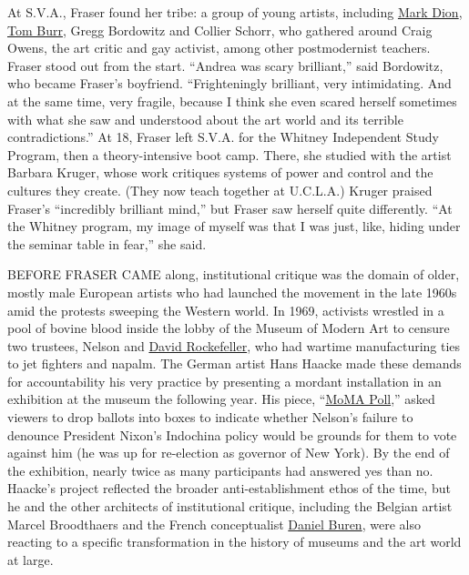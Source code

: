At S.V.A., Fraser found her tribe: a group of young artists, including
\href{https://www.nytimes3xbfgragh.onion/topic/person/mark-dion}{Mark
Dion},
\href{https://www.nytimes3xbfgragh.onion/2019/05/13/t-magazine/site-specific-art.html}{Tom
Burr}, Gregg Bordowitz and Collier Schorr, who gathered around Craig
Owens, the art critic and gay activist, among other postmodernist
teachers. Fraser stood out from the start. ``Andrea was scary
brilliant,'' said Bordowitz, who became Fraser's boyfriend.
``Frighteningly brilliant, very intimidating. And at the same time, very
fragile, because I think she even scared herself sometimes with what she
saw and understood about the art world and its terrible
contradictions.'' At 18, Fraser left S.V.A. for the Whitney Independent
Study Program, then a theory-intensive boot camp. There, she studied
with the artist Barbara Kruger, whose work critiques systems of power
and control and the cultures they create. (They now teach together at
U.C.L.A.) Kruger praised Fraser's ``incredibly brilliant mind,'' but
Fraser saw herself quite differently. ``At the Whitney program, my image
of myself was that I was just, like, hiding under the seminar table in
fear,'' she said.

BEFORE FRASER CAME along, institutional critique was the domain of
older, mostly male European artists who had launched the movement in the
late 1960s amid the protests sweeping the Western world. In 1969,
activists wrestled in a pool of bovine blood inside the lobby of the
Museum of Modern Art to censure two trustees, Nelson and
\href{https://www.nytimes3xbfgragh.onion/2017/03/20/business/david-rockefeller-dead-chase-manhattan-banker.html}{David
Rockefeller}, who had wartime manufacturing ties to jet fighters and
napalm. The German artist Hans Haacke made these demands for
accountability his very practice by presenting a mordant installation in
an exhibition at the museum the following year. His piece,
``\href{https://www.nytimes3xbfgragh.onion/2019/07/15/t-magazine/most-important-contemporary-art.html}{MoMA
Poll},'' asked viewers to drop ballots into boxes to indicate whether
Nelson's failure to denounce President Nixon's Indochina policy would be
grounds for them to vote against him (he was up for re-election as
governor of New York). By the end of the exhibition, nearly twice as
many participants had answered yes than no. Haacke's project reflected
the broader anti-establishment ethos of the time, but he and the other
architects of institutional critique, including the Belgian artist
Marcel Broodthaers and the French conceptualist
\href{https://www.lissongallery.com/artists/daniel-buren}{Daniel Buren},
were also reacting to a specific transformation in the history of
museums and the art world at large.

